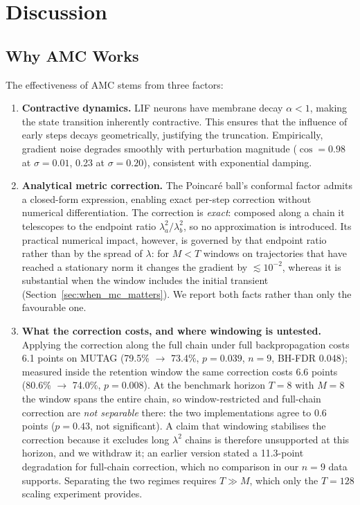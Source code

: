 \documentclass[a4paper,fleqn]{cas-dc}
\begin{document}
\section{Discussion}
\label{sec:discussion}

\subsection{Why AMC Works}

The effectiveness of AMC stems from three factors:

\begin{enumerate}
    \item \textbf{Contractive dynamics.} LIF neurons have membrane decay $\alpha < 1$, making the state transition inherently contractive. This ensures that the influence of early steps decays geometrically, justifying the truncation. Empirically, gradient noise degrades smoothly with perturbation magnitude ($\cos{=}0.98$ at $\sigma{=}0.01$, 0.23 at $\sigma{=}0.20$), consistent with exponential damping.
    
    \item \textbf{Analytical metric correction.} The Poincar\'e ball's conformal factor admits a closed-form expression, enabling exact per-step correction without numerical differentiation. The correction is \emph{exact}: composed along a chain it telescopes to the endpoint ratio $\lambda_a^2/\lambda_b^2$, so no approximation is introduced. Its practical numerical impact, however, is governed by that endpoint ratio rather than by the spread of $\lambda$: for $M<T$ windows on trajectories that have reached a stationary norm it changes the gradient by $\lesssim10^{-2}$, whereas it is substantial when the window includes the initial transient (Section~\ref{sec:when_mc_matters}). We report both facts rather than only the favourable one.

    \item \textbf{What the correction costs, and where windowing is untested.} Applying the correction along the full chain under full backpropagation costs 6.1 points on MUTAG (79.5\% $\to$ 73.4\%, $p{=}0.039$, $n{=}9$, BH-FDR 0.048); measured inside the retention window the same correction costs 6.6 points (80.6\% $\to$ 74.0\%, $p{=}0.008$). At the benchmark horizon $T{=}8$ with $M{=}8$ the window spans the entire chain, so window-restricted and full-chain correction are \emph{not separable} there: the two implementations agree to 0.6 points ($p{=}0.43$, not significant). A claim that windowing stabilises the correction because it excludes long $\lambda^2$ chains is therefore unsupported at this horizon, and we withdraw it; an earlier version stated a 11.3-point degradation for full-chain correction, which no comparison in our $n{=}9$ data supports. Separating the two regimes requires $T \gg M$, which only the $T{=}128$ scaling experiment provides.
    

\end{enumerate}
\end{document}
